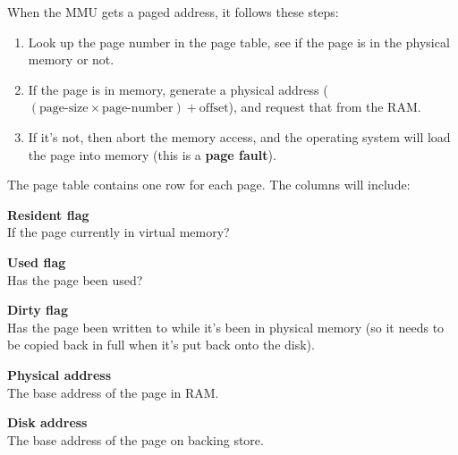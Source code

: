 When the MMU gets a paged address, it follows these steps:

\begin{enumerate}
	\item Look up the page number in the page table, see if the page is in the
		physical memory or not.
	\item If the page is in memory, generate a physical address (
		$(\text{page-size} \times \text{page-number}) + \text{offset}$), and
		request that from the RAM.
	\item If it's not, then abort the memory access, and the operating system
		will load the page into memory (this is a \textbf{page fault}).
\end{enumerate}


The page table contains one row for each page. The columns will include:

\begin{description}
	\item \textbf{Resident flag}\\
		If the page currently in virtual memory?
	\item \textbf{Used flag}\\
		Has the page been used?
	\item \textbf{Dirty flag}\\
		Has the page been written to while it's been in physical memory (so it
		needs to be copied back in full when it's put back onto the disk).
	\item \textbf{Physical address}\\
		The base address of the page in RAM.
	\item \textbf{Disk address}\\
		The base address of the page on backing store.
\end{description}

